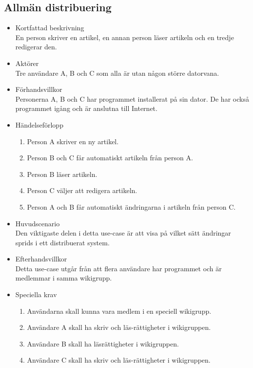 \subsection{Allmän distribuering}
\begin{itemize}
	\item Kortfattad beskrivning
	\\En person skriver en artikel, en annan person läser artikeln och en tredje redigerar den.
	\item Aktörer
	\\Tre användare A, B och C som alla är utan någon större datorvana.
	\item Förhandsvillkor
	\\Personerna A, B och C har programmet installerat på sin dator. De har också programmet igång och är anslutna till Internet.
	\item Händelseförlopp
	\begin{enumerate}
		\item Person A skriver en ny artikel.
		\item Person B och C får automatiskt artikeln från person A.
		\item Person B läser artikeln.
		\item Person C väljer att redigera artikeln.
		\item Person A och B får automatiskt ändringarna i artikeln från person C.
	\end{enumerate}	
	\item Huvudscenario
	\\Den viktigaste delen i detta use-case är att visa på vilket sätt ändringar sprids i ett distribuerat system.
	\item Efterhandsvillkor
	\\Detta use-case utgår från att flera användare har programmet och är medlemmar i samma wikigrupp.
	\item Speciella krav
	\begin{enumerate}	
		\item Användarna skall kunna vara medlem i en speciell wikigrupp.
		\item Användare A skall ha skriv och läs-rättigheter i wikigruppen.
		\item Användare B skall ha läsrättigheter i wikigruppen.
		\item Användare C skall ha skriv och läs-rättigheter i wikigruppen.
	\end{enumerate}
\end{itemize}


